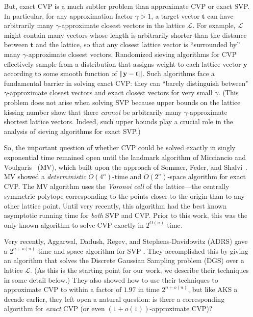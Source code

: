 \documentclass[11pt]{article}
\renewcommand{\vec}[1]{\ensuremath{\mathbf{#1}}}
\newcommand{\problem}[1]{\mbox{#1}\xspace}
\newcommand{\scarequotes}[1]{``#1''}
\newcommand{\lat}{\mathcal{L}}
\DeclarePairedDelimiter\length{\lVert}{\rVert}
\begin{document}
But, exact \problem{CVP} is a much subtler problem than approximate \problem{CVP} or exact \problem{SVP}. In particular, for any approximation factor $\gamma > 1$, a target vector $\vec{t}$ can have arbitrarily many $\gamma$-approximate closest vectors in the lattice $\lat$. For example, $\lat$ might contain many vectors whose length is arbitrarily shorter than the distance between $\vec{t}$ and the lattice, so that any closest lattice vector is \scarequotes{surrounded by} many $\gamma$-approximate closest vectors. Randomized sieving algorithms for \problem{CVP} effectively sample from a distribution that assigns weight to each lattice vector $\vec{y}$ according to some smooth function of $\length{\vec{y} - \vec{t}}$. Such algorithms face a fundamental barrier in solving exact \problem{CVP}: they can \scarequotes{barely distinguish between} $\gamma$-approximate closest vectors and exact closest vectors for very small $\gamma$. (This problem does not arise when solving \problem{SVP} because upper bounds on the lattice kissing number show that there \emph{cannot} be arbitrarily many $\gamma$-approximate shortest lattice vectors. Indeed, such upper bounds play a crucial role in the analysis of sieving algorithms for exact \problem{SVP}.)

So, the important question of whether \problem{CVP} could be solved exactly in singly exponential time remained open until the landmark algorithm of Micciancio and Voulgaris~\cite{MV13}
(MV), which built upon the approach of Sommer, Feder, and
Shalvi~\cite{SFS09}. MV showed a \emph{deterministic} $\widetilde{O}(4^n)$-time and
$\widetilde{O}(2^n)$-space algorithm for exact \problem{CVP}.  
The MV algorithm uses the
\emph{Voronoi cell} of the lattice---the centrally symmetric polytope
corresponding to the points closer to the origin than to any other lattice
point. Until very recently, this algorithm had the best known asymptotic running
time for \emph{both} \problem{SVP} and \problem{CVP}. Prior to this work, this was
the only known algorithm to solve \problem{CVP} exactly in $2^{O(n)}$
time.

Very recently, Aggarwal, Dadush, Regev, and Stephens-Davidowitz (ADRS) gave a $2^{n + o(n)}$-time and space algorithm for \problem{SVP} \cite{ADRS15}. They accomplished this by giving an algorithm that solves the Discrete Gaussian Sampling problem (\problem{DGS}) over a lattice $\lat$. (As this is the starting point for our work, we describe their techniques in some detail below.) They also showed how to use their techniques to approximate \problem{CVP} to within a factor of $1.97$ in time $2^{n+o(n)}$, but like AKS a decade earlier, they left open a natural question: is there a corresponding algorithm for \emph{exact} \problem{CVP} (or even $(1+o(1))$-approximate \problem{CVP})?
\end{document}

